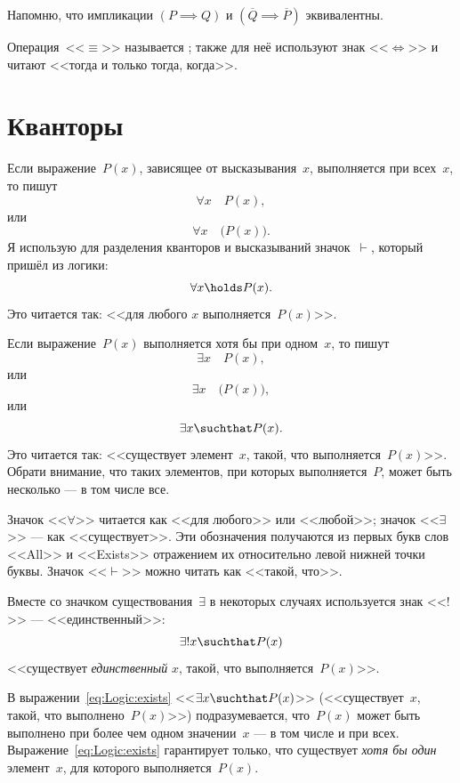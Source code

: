 \begin{note}
	Напомню, что импликации $(P \implies Q)$ и $(\overline{Q} \implies \overline{P})$ эквивалентны.
\end{note}

\begin{note}
	Операция~<<$\equiv$>> называется ; также для неё используют знак <<$\Longleftrightarrow$>> и читают <<тогда и только тогда, когда>>.
\end{note}


\section{Кванторы}

Если выражение~$P(x)$, зависящее от высказывания~$x$, выполняется при всех~$x$, то пишут
\[
	\forall x
	\quad
	P(x)
	,
\]
или
\[
	\forall x
	\quad
	\bigl(
		P(x)
	\bigr)
	.
\]
Я использую для разделения кванторов и высказываний значок~$\vdash$, который пришёл из логики:
\begin{equation}
	\label{eq:Logic:forall}
	\forall x \holds P(x)
	.
\end{equation}
Это читается так: <<для любого $x$ выполняется~$P(x)$>>.

Если выражение~$P(x)$ выполняется хотя бы при одном~$x$, то пишут
\[
	\exists x 
	\quad
	P(x),
\]
или
\[
	\exists x
	\quad
	\bigl(
		P(x)
	\bigr)
	,
\]
или
\begin{equation}
	\label{eq:Logic:exists}
	\exists x
	\suchthat
	P(x)
	.
\end{equation}
Это читается так: <<существует элемент~$x$, такой, что выполняется~$P(x)$>>.
Обрати внимание, что таких элементов, при которых выполняется~$P$, может быть
несколько --- в том числе все.

Значок <<$\forall$>> читается как <<для любого>> или <<любой>>; значок
<<$\exists$>> --- как <<существует>>. Эти обозначения получаются из первых букв
слов <<All>> и <<Exists>> отражением их относительно левой нижней точки буквы.
Значок <<$\vdash$>> можно читать как <<такой, что>>.

Вместе со значком существования~$\exists$ в некоторых случаях используется знак
<<$!$>> --- <<единственный>>:
\[
	\exists! x \suchthat P(x)
\]
<<существует \emph{единственный} $x$, такой, что выполняется~$P(x)$>>.

\begin{note}
	В выражении~\eqref{eq:Logic:exists} <<$\exists x \suchthat P(x)$>>
	(<<существует~$x$, такой, что выполнено~$P(x)$>>) подразумевается, что~$P(x)$
	может быть выполнено при более чем одном значении~$x$ --- в том числе и при
	всех. Выражение~\eqref{eq:Logic:exists} гарантирует только, что существует
	\emph{хотя бы один} элемент~$x$, для которого выполняется~$P(x)$.
\end{note}

